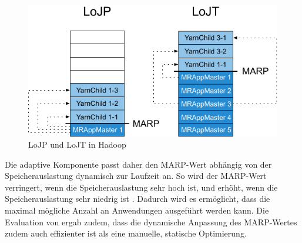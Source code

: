 \begin{figure}
    \centering
    \includegraphics[width=.8\columnwidth]{./images/marpValue.pdf}
    \caption[LoJP und LoJT in Hadoop]{LoJP und LoJT in Hadoop \cite{zhang2016}}
    \label{fig:marpValue}
\end{figure}

Die adaptive Komponente passt daher den MARP-Wert abhängig von der Speicherauslastung dynamisch zur Laufzeit an. So wird der MARP-Wert verringert, wenn die Speicherauslastung sehr hoch ist, und erhöht, wenn die Speicherauslastung sehr niedrig ist \cite{zhang2016}. Dadurch wird es ermöglicht, dass die maximal mögliche Anzahl an Anwendungen ausgeführt werden kann. Die Evaluation von \citeauthor{zhang2016} ergab zudem, dass die dynamische Anpassung des MARP-Wertes zudem auch effizienter ist als eine manuelle, statische Optimierung.
